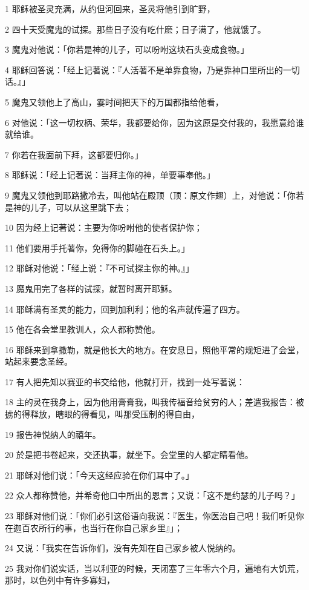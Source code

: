 \par 1 耶稣被圣灵充满，从约但河回来，圣灵将他引到旷野，
\par 2 四十天受魔鬼的试探。那些日子没有吃什麽；日子满了，他就饿了。
\par 3 魔鬼对他说：「你若是神的儿子，可以吩咐这块石头变成食物。」
\par 4 耶稣回答说：「经上记著说：『人活著不是单靠食物，乃是靠神口里所出的一切话。』」
\par 5 魔鬼又领他上了高山，霎时间把天下的万国都指给他看，
\par 6 对他说：「这一切权柄、荣华，我都要给你，因为这原是交付我的，我愿意给谁就给谁。
\par 7 你若在我面前下拜，这都要归你。」
\par 8 耶稣说：「经上记著说：当拜主你的神，单要事奉他。」
\par 9 魔鬼又领他到耶路撒冷去，叫他站在殿顶（顶：原文作翅）上，对他说：「你若是神的儿子，可以从这里跳下去；
\par 10 因为经上记著说：主要为你吩咐他的使者保护你；
\par 11 他们要用手托著你，免得你的脚碰在石头上。」
\par 12 耶稣对他说：「经上说：『不可试探主你的神。』」
\par 13 魔鬼用完了各样的试探，就暂时离开耶稣。
\par 14 耶稣满有圣灵的能力，回到加利利；他的名声就传遍了四方。
\par 15 他在各会堂里教训人，众人都称赞他。
\par 16 耶稣来到拿撒勒，就是他长大的地方。在安息日，照他平常的规矩进了会堂，站起来要念圣经。
\par 17 有人把先知以赛亚的书交给他，他就打开，找到一处写著说：
\par 18 主的灵在我身上，因为他用膏膏我，叫我传福音给贫穷的人；差遣我报告：被掳的得释放，瞎眼的得看见，叫那受压制的得自由，
\par 19 报告神悦纳人的禧年。
\par 20 於是把书卷起来，交还执事，就坐下。会堂里的人都定睛看他。
\par 21 耶稣对他们说：「今天这经应验在你们耳中了。」
\par 22 众人都称赞他，并希奇他口中所出的恩言；又说：「这不是约瑟的儿子吗？」
\par 23 耶稣对他们说：「你们必引这俗语向我说：『医生，你医治自己吧！我们听见你在迦百农所行的事，也当行在你自己家乡里』」；
\par 24 又说：「我实在告诉你们，没有先知在自己家乡被人悦纳的。
\par 25 我对你们说实话，当以利亚的时候，天闭塞了三年零六个月，遍地有大饥荒，那时，以色列中有许多寡妇，
